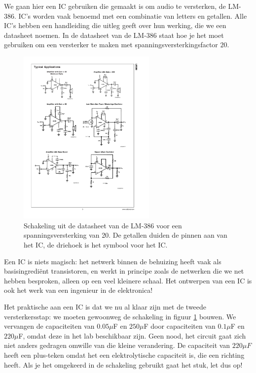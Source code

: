 \documentclass{article}
\begin{document}
			We gaan hier een IC gebruiken die gemaakt is om audio te versterken, de LM-386. IC's worden vaak benoemd met een combinatie van letters en getallen. Alle IC's hebben een handleiding die uitleg geeft over hun werking, die we een datasheet noemen. In de datasheet van de LM-386 staat hoe je het moet gebruiken om een versterker te maken met spanningsversterkingsfactor $20$.

			\begin{figure}[htbp]
				\centering
				\includegraphics[width=0.6\textwidth]{IC_versterker}
				\caption{Schakeling uit de datasheet van de LM-386 voor een spanningsversterking van 20. De getallen duiden de pinnen aan van het IC, de driehoek is het symbool voor het IC. }
				\label{fig:IC_versterker}
			\end{figure}

			Een IC is niets magisch: het netwerk binnen de behuizing heeft vaak als basisingredi\"ent transistoren, en werkt in principe zoals de netwerken die we net hebben besproken, alleen op een veel kleinere schaal. Het ontwerpen van een IC is ook het werk van een ingenieur in de elektronica!

			Het praktische aan een IC is dat we nu al klaar zijn met de tweede versterkersstap: we moeten gewoonweg de schakeling in figuur \ref{fig:IC_versterker} bouwen. We vervangen de capaciteiten van $0.05 \mu$F en $250\mu$F door capaciteiten van $0.1\mu$F en $220\mu$F, omdat deze in het lab beschikbaar zijn. Geen nood,  het circuit gaat zich niet anders gedragen omwille van die kleine verandering. De capaciteit van $220\mu F$ heeft een plus-teken omdat het een elektrolytische capaciteit is, die een richting heeft. Als je het omgekeerd in de schakeling gebruikt gaat het stuk, let dus op!
\end{document}
